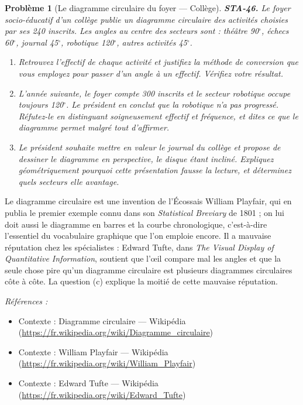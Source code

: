 \documentclass[11pt]{article}
\newtheorem{problem}{Problème}
\newenvironment{refs}{\par\small\noindent\emph{Références :}\begin{itemize}\setlength\itemsep{0pt}}{\end{itemize}\normalsize}
\begin{document}
\bigskip

\begin{problem}[{Le diagramme circulaire du foyer --- Collège}]
\textbf{STA-46.} Le foyer socio-éducatif d'un collège publie un diagramme circulaire des
activités choisies par ses 240 inscrits. Les angles au centre des secteurs sont : théâtre 90$^\circ$,
échecs 60$^\circ$, journal 45$^\circ$, robotique 120$^\circ$, autres activités 45$^\circ$.
\begin{enumerate}
\item[(a)] Retrouvez l'effectif de chaque activité et justifiez la méthode de conversion que vous
employez pour passer d'un angle à un effectif. Vérifiez votre résultat.
\item[(b)] L'année suivante, le foyer compte 300 inscrits et le secteur \og{} robotique \fg{} occupe toujours
120$^\circ$. Le président en conclut que la robotique n'a pas progressé. Réfutez-le en distinguant
soigneusement effectif et fréquence, et dites ce que le diagramme permet malgré tout
d'affirmer.
\item[(c)] Le président souhaite mettre en valeur le journal du collège et propose de dessiner le
diagramme en perspective, le disque étant incliné. Expliquez géométriquement pourquoi cette
présentation fausse la lecture, et déterminez quels secteurs elle avantage.
\end{enumerate}

\end{problem}

\noindent Le diagramme circulaire est une invention de l'Écossais William Playfair, qui en
publia le premier exemple connu dans son \textit{Statistical Breviary} de 1801 ; on lui doit aussi le
diagramme en barres et la courbe chronologique, c'est-à-dire l'essentiel du vocabulaire graphique
que l'on emploie encore. Il a mauvaise réputation chez les spécialistes : Edward Tufte, dans
\textit{The Visual Display of Quantitative Information}, soutient que l'\oe{}il compare mal les angles et
que la seule chose pire qu'un diagramme circulaire est plusieurs diagrammes circulaires côte à
côte. La question (c) explique la moitié de cette mauvaise réputation.

\begin{refs}
\item Contexte : Diagramme circulaire --- Wikipédia (\url{https://fr.wikipedia.org/wiki/Diagramme_circulaire})
\item Contexte : William Playfair --- Wikipédia (\url{https://fr.wikipedia.org/wiki/William_Playfair})
\item Contexte : Edward Tufte --- Wikipédia (\url{https://fr.wikipedia.org/wiki/Edward_Tufte})
\end{refs}
\end{document}
